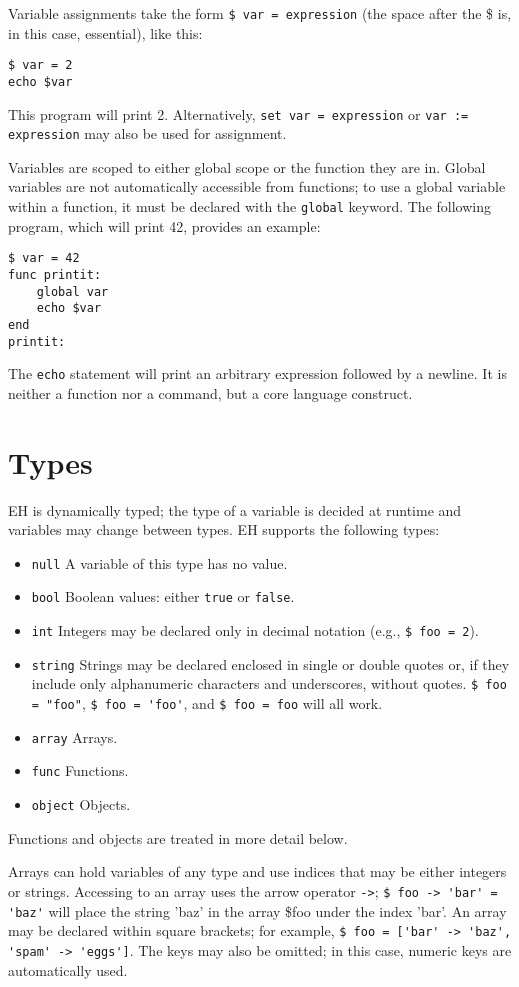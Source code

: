 \documentclass{article}
\begin{document}
Variable assignments take the form \verb#$ var = expression# (the space after the \$ is, in this case, essential), like this:
\begin{verbatim}
$ var = 2
echo $var
\end{verbatim}
This program will print 2. Alternatively, \verb#set var = expression# or \verb#var := expression# may also be used for assignment.

Variables are scoped to either global scope or the function they are in. Global variables are not automatically accessible from functions; to use a global variable within a function, it must be declared with the \verb#global# keyword. The following program, which will print 42, provides an example:
\begin{verbatim}
$ var = 42
func printit:
	global var
	echo $var
end
printit:
\end{verbatim}

The \verb#echo# statement will print an arbitrary expression followed by a newline. It is neither a function nor a command, but a core language construct.

\section{Types}
EH is dynamically typed; the type of a variable is decided at runtime and variables may change between types. EH supports the following types:
\begin{itemize}
\item \verb#null# A variable of this type has no value.
\item \verb#bool# Boolean values: either \verb#true# or \verb#false#.
\item \verb#int# Integers may be declared only in decimal notation (e.g., \verb#$ foo = 2#).
\item \verb#string# Strings may be declared enclosed in single or double quotes or, if they include only alphanumeric characters and underscores, without quotes. \verb#$ foo = "foo"#, \verb#$ foo = 'foo'#, and \verb#$ foo = foo# will all work.
\item \verb#array# Arrays.
\item \verb#func# Functions.
\item \verb#object# Objects.
\end{itemize}
Functions and objects are treated in more detail below.

Arrays can hold variables of any type and use indices that may be either integers or strings. Accessing to an array uses the arrow operator \verb#->#; \verb#$ foo -> 'bar' = 'baz'# will place the string 'baz' in the array \$foo under the index 'bar'. An array may be declared within square brackets; for example, \verb#$ foo = ['bar' -> 'baz', 'spam' -> 'eggs']#. The keys may also be omitted; in this case, numeric keys are automatically used.
\end{document}
